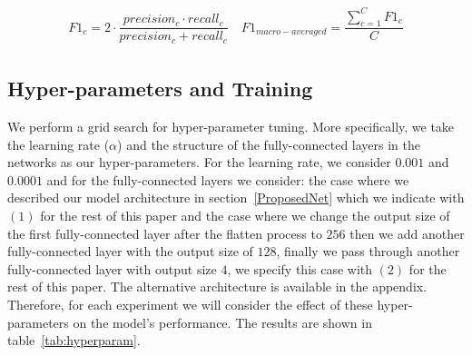\documentclass{article} %
\begin{document}
 \begin{align}
\label{eqn:eqlabel2}
\begin{split}
F1_c = 2 \cdot \dfrac{precision_c \cdot recall_c}{precision_c + recall_c} \quad
F1_{macro-averaged} = \dfrac{\sum_{c=1}^{C} F1_c}{C}
\end{split}
\end{align}



\subsection{Hyper-parameters and Training}
We perform a grid search for hyper-parameter tuning. More specifically, we take the learning rate ($\alpha$) and the structure of the fully-connected layers in the networks as our hyper-parameters. For the learning rate, we consider $0.001$ and $0.0001$ and for the fully-connected layers we consider: the case where we described our model architecture in section~\ref{ProposedNet} which we indicate with $(1)$ for the rest of this paper and the case where we change the output size of the first fully-connected layer after the flatten process to $256$ then we add another fully-connected layer with the output size of $128$, finally we pass through another fully-connected layer with output size $4$, we specify this case with $(2)$ for the rest of this paper. The alternative architecture is available in the appendix. Therefore, for each experiment we will consider the effect of these hyper-parameters on the model's performance. The results are shown in table~\ref{tab:hyperparam}.
\end{document}
